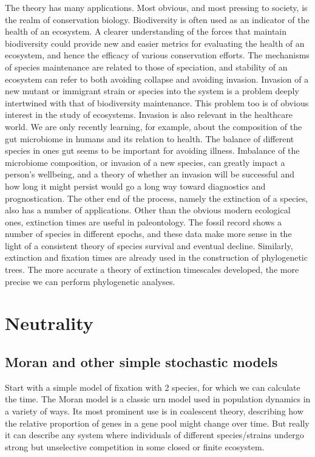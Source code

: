 \documentclass[a4paper,11pt]{article}
\numberwithin{equation}{section} %
\begin{document}
The theory has many applications. 
Most obvious, and most pressing to society, is the realm of conservation biology. Biodiversity is often used as an indicator of the health of an ecosystem. A clearer understanding of the forces that maintain biodiversity could provide new and easier metrics for evaluating the health of an ecosystem, and hence the efficacy of various conservation efforts. 
The mechanisms of species maintenance are related to those of speciation, and stability of an ecosystem can refer to both avoiding collapse and avoiding invasion. Invasion of a new mutant or immigrant strain or species into the system is a problem deeply intertwined with that of biodiversity maintenance. This problem too is of obvious interest in the study of ecosystems. 
Invasion is also relevant in the healthcare world. We are only recently learning, for example, about the composition of the gut microbiome in humans and its relation to health. The balance of different species in ones gut seems to be important for avoiding illness. Imbalance of the microbiome composition, or invasion of a new species, can greatly impact a person's wellbeing, and a theory of whether an invasion will be successful and how long it might persist would go a long way toward diagnostics and prognostication. 
The other end of the process, namely the extinction of a species, also has a number of applications. Other than the obvious modern ecological ones, extinction times are useful in paleontology. The fossil record shows a number of species in different epochs, and these data make more sense in the light of a consistent theory of species survival and eventual decline. 
Similarly, extinction and fixation times are already used in the construction of phylogenetic trees. The more accurate a theory of extinction timescales developed, the more precise we can perform phylogenetic analyses. 







\section{Neutrality}
\subsection{Moran and other simple stochastic models}
Start with a simple model of fixation with 2 species, for which we can calculate the time. 
The Moran model \cite{Moran1962} is a classic urn model used in population dynamics in a variety of ways. 
Its most prominent use is in coalescent theory, describing how the relative proportion of genes in a gene pool might change over time. 
But really it can describe any system where individuals of different species/strains undergo strong but unselective competition in some closed or finite ecosystem. 
\end{document}

